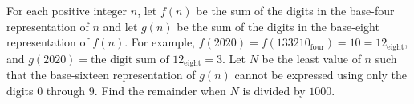 For each positive integer $n$, let $f(n)$ be the sum of the digits in the base-four representation of $n$ and let $g(n)$ be the sum of the digits in the base-eight representation of $f(n)$. For example, $f(2020) = f(133210_\text{four}) = 10 = 12_\text{eight}$, and $g(2020) = \text{the digit sum of } 12_\text{eight} = 3$. Let $N$ be the least value of $n$ such that the base-sixteen representation of $g(n)$ cannot be expressed using only the digits $0$ through $9.$ Find the remainder when $N$ is divided by $1000.$